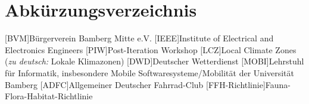 \chapter*{Abkürzungsverzeichnis}

\begin{acronym}
    [BVM]{Bürgerverein Bamberg Mitte e.V.}
    [IEEE]{Institute of Electrical and Electronics Engineers}
    [PIW]{Post-Iteration Workshop}
    [LCZ]{Local Climate Zones (\textit{zu deutsch:} Lokale Klimazonen)}
    [DWD]{Deutscher Wetterdienst}
    [MOBI]{Lehrstuhl für Informatik, insbesondere Mobile Softwaresysteme/Mobilität der Universität Bamberg}
    [ADFC]{Allgemeiner Deutscher Fahrrad-Club}
    [FFH-Richtlinie]{Fauna-Flora-Habitat-Richtlinie}
\end{acronym}